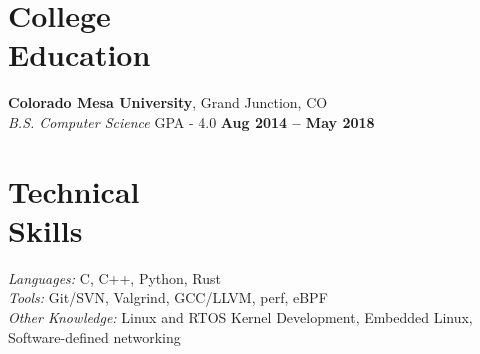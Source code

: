 \documentclass[margin,line]{resume}
\begin{document}
\begin{resume}
    \section{\mysidestyle College\\Education}

    \textbf{Colorado Mesa University}, Grand Junction, CO \vspace{1mm}\\\vspace{1mm}%
    \textsl{B.S. Computer Science} GPA - 4.0 \hfill \textbf{Aug 2014 -- May 2018}

    \section{\mysidestyle Technical\\Skills}

    \emph{Languages:} C, C++, Python, Rust\\
    \emph{Tools:} Git/SVN, Valgrind, GCC/LLVM, perf, eBPF\\
    \emph{Other Knowledge:} Linux and RTOS Kernel Development, Embedded Linux, Software-defined networking\\
\end{resume}
\end{document}
